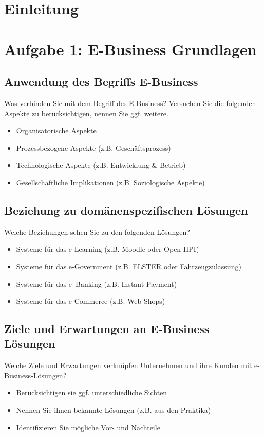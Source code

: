 \documentclass[notitlepage, hidelinks]{article}
\begin{document}
\thispagestyle{empty}
\clearpage
\newpage
\tableofcontents
\thispagestyle{empty}
\clearpage

\normalsize
{}


\section{Einleitung}

\section{Aufgabe 1: E-Business Grundlagen}

\subsection{Anwendung des Begriffs E-Business}
Was verbinden Sie mit dem Begriff des E-Business? Versuchen Sie die folgenden Aspekte zu berücksichtigen, nennen Sie ggf. weitere.
\begin{itemize}
\item Organisatorische Aspekte
\item Prozessbezogene Aspekte (z.B. Geschäftsprozess)
\item Technologische Aspekte (z.B. Entwicklung \& Betrieb)
\item Gesellschaftliche Implikationen (z.B. Soziologische Aspekte)
\end{itemize}

\subsection{Beziehung zu domänenspezifischen Lösungen}
Welche Beziehungen sehen Sie zu den folgenden Lösungen?
\begin{itemize}
\item Systeme für das e-Learning (z.B. Moodle oder Open HPI)
\item Systeme für das e-Government (z.B. ELSTER oder Fahrzeugzulassung)
\item Systeme für das e–Banking (z.B. Instant Payment)
\item Systeme für das e-Commerce (z.B. Web Shops)
\end{itemize}

\subsection{Ziele und Erwartungen an E-Business Lösungen}
Welche Ziele und Erwartungen verknüpfen Unternehmen und ihre Kunden mit e-Business-Lösungen?
\begin{itemize}
\item Berücksichtigen sie ggf. unterschiedliche Sichten
\item Nennen Sie ihnen bekannte Lösungen (z.B. aus den Praktika)
\item Identifizieren Sie mögliche Vor- und Nachteile
\end{itemize}
\end{document}
